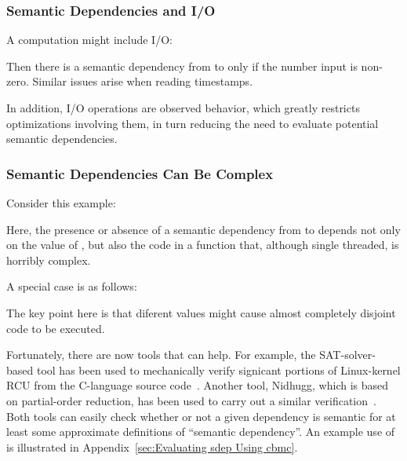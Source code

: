 \documentclass[10]{article}
\begin{document}
\subsubsection{Semantic Dependencies and I/O}
\label{sec:Semantic Dependencies and I/O}

A computation might include I/O:

\begin{quote}
\end{quote}

Then there is a semantic dependency from  to  only if
the number input is non-zero.
Similar issues arise when reading timestamps.

In addition, I/O operations are observed behavior, which greatly restricts
optimizations involving them, in turn reducing the need to evaluate
potential semantic dependencies.

\subsubsection{Semantic Dependencies Can Be Complex}
\label{sec:Semantic Dependencies Can Be Complex}

Consider this example:

\begin{quote}
\end{quote}

Here, the presence or absence of a semantic dependency from  to
 depends not only on the value of , but also the code in a
function that, although single threaded, is horribly complex.

A special case is as follows:

\begin{quote}
\end{quote}

The key point here is that diferent values might cause almost completely
disjoint code to be executed.

Fortunately, there are now tools that can help.
For example, the SAT-solver-based  tool
has been used to mechanically verify signicant portions of Linux-kernel
RCU from the C-language source
code~\cite{LihaoLiang2016VerifyTreeRCU,LanceRoy2017CBMC-SRCU}.
Another tool, Nidhugg, which is based on partial-order
reduction, has been used to carry out a similar
verification~\cite{MichalisKokologiannakis2017NidhuggRCU,SMC-TreeRCU,MichalisKokologiannakis2019RCUstatelessModelCheck}.
Both tools can easily check whether or not a given dependency is semantic
for at least some approximate definitions of ``semantic dependency''.
An example use of  is illustrated in
Appendix~\ref{sec:Evaluating sdep Using cbmc}.
\end{document}
